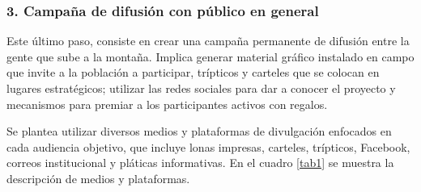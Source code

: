 





\newpage
\subsubsection{3. Campaña de difusión con público en general}

Este último paso, consiste en crear una campaña permanente de difusión entre la gente que sube a la montaña. Implica generar material gráfico instalado en campo que invite a la población a participar, trípticos y carteles que se colocan en lugares estratégicos;  utilizar las redes sociales para dar a conocer el proyecto y mecanismos para premiar a los participantes activos con regalos. 


Se plantea utilizar diversos medios y plataformas de divulgación enfocados en cada audiencia objetivo, que incluye lonas impresas, carteles, trípticos, Facebook, correos institucional y pláticas informativas. En el cuadro \ref{tab1} se muestra la descripción de medios y plataformas.

